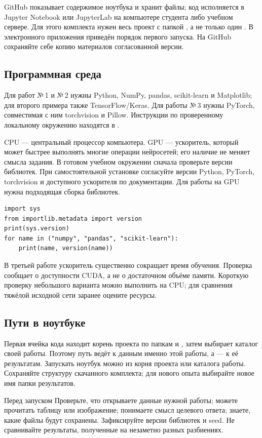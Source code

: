 GitHub показывает содержимое ноутбука и хранит файлы; код исполняется в Jupyter Notebook или JupyterLab на компьютере студента либо учебном сервере. Для этого комплекта нужен весь проект с папкой , а не только один . В  электронного приложения приведён порядок первого запуска. На GitHub сохраняйте себе копию материалов согласованной версии.

\subsection*{Программная среда}
Для работ №\,1 и №\,2 нужны Python, NumPy, pandas, scikit-learn и Matplotlib; для второго примера также TensorFlow/Keras. Для работы №\,3 нужны PyTorch, совместимая с ним torchvision и Pillow. Инструкции по проверенному локальному окружению находятся в .

CPU --- центральный процессор компьютера. GPU --- ускоритель, который может быстрее выполнять многие операции нейросетей; его наличие не меняет смысла задания. В готовом учебном окружении сначала проверьте версии библиотек. При самостоятельной установке согласуйте версии Python, PyTorch, torchvision и доступного ускорителя по документации. Для работы на GPU нужна подходящая сборка библиотек.

\begin{lstlisting}
import sys
from importlib.metadata import version
print(sys.version)
for name in ("numpy", "pandas", "scikit-learn"):
    print(name, version(name))
\end{lstlisting}

В третьей работе ускоритель существенно сокращает время обучения. Проверка  сообщает о доступности CUDA, а не о достаточном объёме памяти. Короткую проверку небольшого варианта можно выполнить на CPU; для сравнения тяжёлой исходной сети заранее оцените ресурсы.

\subsection*{Пути в ноутбуке}
Первая ячейка кода находит корень проекта по папкам  и , затем выбирает каталог своей работы. Поэтому путь  ведёт к данным именно этой работы, а  --- к её результатам. Запускать ноутбук можно из корня проекта или каталога работы. Сохраняйте структуру скачанного комплекта; для нового опыта выбирайте новое имя папки результатов.

\begin{keybox}{Перед запуском}
Проверьте, что открываете данные нужной работы; можете прочитать таблицу или изображение; понимаете смысл целевого ответа; знаете, какие файлы будут сохранены. Зафиксируйте версии библиотек и seed. Не сравнивайте результаты, полученные на незаметно разных разбиениях.
\end{keybox}
